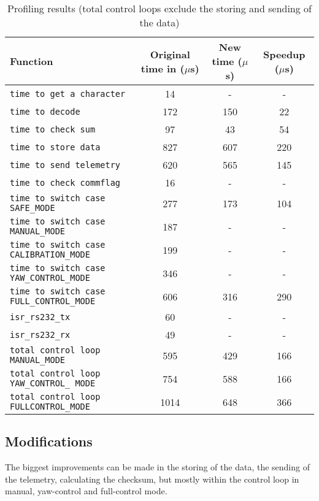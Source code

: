 \documentclass{article}
\begin{document}
\begin{table}[ht]
\centering
\begin{tabular}{|l|c|c|c|}
\hline 
\textbf{Function} & \textbf{Original time in ($\mu$s)}  & \textbf{New time ($\mu$s)} & \textbf{Speedup ($\mu$s)}\\ 
\hline
\hline
\texttt{time to get a character} & 14  & - & -\\
\hline
\texttt{time to decode} & 172 & 150 & 22\\
\hline
\texttt{time to check sum} & 97 & 43 & 54\\
\hline
\texttt{time to store data} & 827 & 607 & 220\\
\hline
\texttt{time to send telemetry} & 620 & 565 & 145\\
\hline 
\texttt{time to check commflag} & 16 & - & -\\
\hline
\texttt{time to switch case SAFE\_MODE} & 277 & 173 & 104\\
\hline
\texttt{time to switch case MANUAL\_MODE} & 187 & - & -\\
\hline
\texttt{time to switch case CALIBRATION\_MODE} & 199 & - & -\\
\hline
\texttt{time to switch case YAW\_CONTROL\_MODE} & 346 & - & -\\
\hline
\texttt{time to switch case FULL\_CONTROL\_MODE} & 606  & 316 & 290 \\
\hline
\texttt{isr\_rs232\_tx} & 60  & - & -\\
\hline
\texttt{isr\_rs232\_rx} &  49 & -& -\\
\hline
\hline
\texttt{total control loop MANUAL\_MODE} & 595 & 429 & 166 \\
\hline
\texttt{total control loop YAW\_CONTROL\_ MODE} & 754 & 588 & 166 \\
\hline
\texttt{total control loop FULL\-CONTROL\_MODE} & 1014 & 648 & 366 \\
\hline
\end{tabular} 
\caption{Profiling results (total control loops exclude the storing and sending of the data)}
\label{tbl:profiling}
\end{table}

\subsection{Modifications}
\label{sec:modifications}
The biggest improvements can be made in the storing of the data, the sending of the telemetry, calculating the checksum, but mostly within the control loop in manual, yaw-control and full-control mode. 
\end{document}
